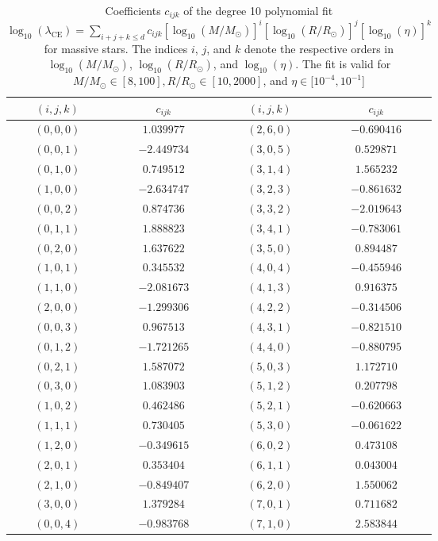 \begin{table}
\centering
\caption{Coefficients $c_{ijk}$ of the degree 10 polynomial fit $\log_{10}(\lambda_{\mathrm{CE}})=\sum_{i+j+k\leq d}c_{ijk}\left[\log_{10}(M/M_\odot)\right]^i\left[\log_{10}(R/R_\odot)\right]^j\left[\log_{10}(\eta)\right]^k$ for massive stars. The indices $i$, $j$, and $k$ denote the respective orders in $\log_{10}(M/M_\odot)$, $\log_{10}(R/R_\odot)$, and $\log_{10}(\eta)$. The fit is valid for $M/M_\odot\in[8,100], R/R_\odot\in[10,2000]$, and $\eta\in[10^{-4},10^{-1}$]}
\label{tab:lambda_ce_3d_coef_massive}
\begin{tabular}{cc@{\qquad}cc}
\hline
$(i,j,k)$ & $c_{ijk}$ & $(i,j,k)$ & $c_{ijk}$ \\
\hline
$(0,0,0)$ & $1.039977$ & $(2,6,0)$ & $-0.690416$ \\
$(0,0,1)$ & $-2.449734$ & $(3,0,5)$ & $0.529871$ \\
$(0,1,0)$ & $0.749512$ & $(3,1,4)$ & $1.565232$ \\
$(1,0,0)$ & $-2.634747$ & $(3,2,3)$ & $-0.861632$ \\
$(0,0,2)$ & $0.874736$ & $(3,3,2)$ & $-2.019643$ \\
$(0,1,1)$ & $1.888823$ & $(3,4,1)$ & $-0.783061$ \\
$(0,2,0)$ & $1.637622$ & $(3,5,0)$ & $0.894487$ \\
$(1,0,1)$ & $0.345532$ & $(4,0,4)$ & $-0.455946$ \\
$(1,1,0)$ & $-2.081673$ & $(4,1,3)$ & $0.916375$ \\
$(2,0,0)$ & $-1.299306$ & $(4,2,2)$ & $-0.314506$ \\
$(0,0,3)$ & $0.967513$ & $(4,3,1)$ & $-0.821510$ \\
$(0,1,2)$ & $-1.721265$ & $(4,4,0)$ & $-0.880795$ \\
$(0,2,1)$ & $1.587072$ & $(5,0,3)$ & $1.172710$ \\
$(0,3,0)$ & $1.083903$ & $(5,1,2)$ & $0.207798$ \\
$(1,0,2)$ & $0.462486$ & $(5,2,1)$ & $-0.620663$ \\
$(1,1,1)$ & $0.730405$ & $(5,3,0)$ & $-0.061622$ \\
$(1,2,0)$ & $-0.349615$ & $(6,0,2)$ & $0.473108$ \\
$(2,0,1)$ & $0.353404$ & $(6,1,1)$ & $0.043004$ \\
$(2,1,0)$ & $-0.849407$ & $(6,2,0)$ & $1.550062$ \\
$(3,0,0)$ & $1.379284$ & $(7,0,1)$ & $0.711682$ \\
$(0,0,4)$ & $-0.983768$ & $(7,1,0)$ & $2.583844$ \\

\end{tabular}
\end{table}
